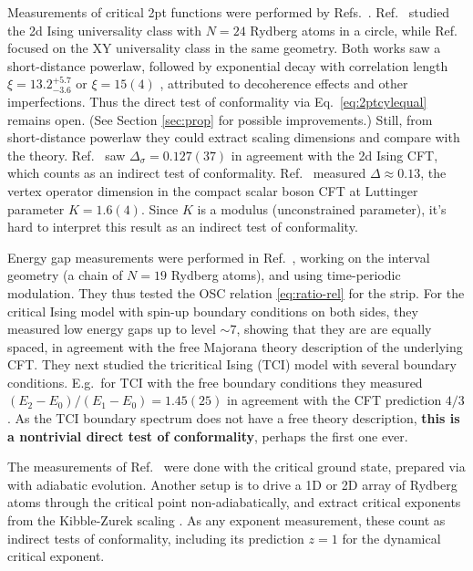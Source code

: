 \documentclass[a4paper,11pt]{article}
\theoremstyle{remark}
\theoremstyle{theorem}
\begin{document}
Measurements of critical 2pt functions were performed by Refs.~\cite{Fang:2024uyf,Emperauger:2025raf}.
Ref.~\cite{Fang:2024uyf} studied the 2d Ising universality class with $N=24$ Rydberg atoms in a circle, while Ref.~\cite{Emperauger:2025raf} focused on the XY universality class in the same geometry.
Both works saw a short-distance powerlaw, followed by exponential decay with correlation length $\xi=13.2^{+5.7}_{-3.6}$ \cite{Fang:2024uyf} or $\xi=15(4)$ \cite{Emperauger:2025raf}, attributed to decoherence effects and other imperfections. Thus the direct test of conformality via Eq.~\eqref{eq:2ptcylequal} remains open. (See Section \ref{sec:prop} for possible improvements.) Still, from short-distance powerlaw they could extract scaling dimensions and compare with the theory. Ref.~\cite{Fang:2024uyf} saw $\Delta_\sigma=0.127(37)$ in agreement with the 2d Ising CFT, which counts as an indirect test of conformality. Ref.~\cite{Emperauger:2025raf} measured $\Delta\approx 0.13$, the vertex operator dimension in the compact scalar boson CFT at Luttinger parameter $K=1.6(4)$. Since $K$ is a modulus (unconstrained parameter), it's hard to interpret this result as an indirect test of conformality.

Energy gap measurements were performed in Ref.~\cite{Sun:2026aqf}, working on the interval geometry (a chain of $N=19$ Rydberg atoms), and using time-periodic modulation. They thus tested the OSC relation \eqref{eq:ratio-rel} for the strip. For the critical Ising model with spin-up boundary conditions on both sides, they measured low energy gaps up to level $\sim7$, showing that they are are equally spaced, in agreement with the free Majorana theory description of the underlying CFT. They next studied the tricritical Ising (TCI) model with several boundary conditions. E.g.~for TCI with the free boundary conditions they measured $(E_2-E_0)/(E_1-E_0)=1.45(25)$ in agreement with the CFT prediction $4/3$. As the TCI boundary spectrum does not have a free theory description, {\bf this is a nontrivial direct test of conformality}, perhaps the first one ever.

The measurements of Ref.~\cite{Fang:2024uyf,Emperauger:2025raf,Sun:2026aqf} were done with the critical ground state, prepared via with adiabatic evolution. Another setup is to drive a 1D \cite{Keesling:2018ish,Zhang:2025xkp} or 2D \cite{Ebadi:2020ldi,Manovitz:2024hif} array of Rydberg atoms through the critical point non-adiabatically, and extract critical exponents from the Kibble-Zurek scaling \cite{delCampo:2013nla}. As any exponent measurement, these count as indirect tests of conformality, including its prediction $z=1$ for the dynamical critical exponent. 
\end{document}
